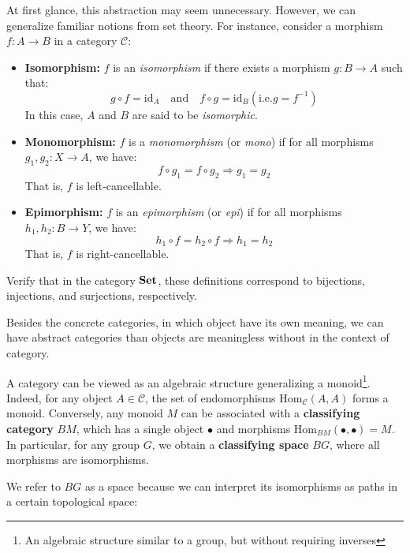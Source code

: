 At first glance, this abstraction may seem unnecessary. However, we can generalize familiar notions from set theory. For instance, consider a morphism $f: A \to B$ in a category $\mathcal{C}$:

\begin{itemize}
    \item \textbf{Isomorphism:} $f$ is an \emph{isomorphism} if there exists a morphism $g: B \to A$ such that:
    \[
      g \circ f = \mathrm{id}_A \quad \text{and} \quad f \circ g = \mathrm{id}_B (\text{i.e.} g=f^{-1})
    \]
    In this case, $A$ and $B$ are said to be \emph{isomorphic}.

    \item \textbf{Monomorphism:} $f$ is a \emph{monomorphism} (or \emph{mono}) if for all morphisms $g_1, g_2: X \to A$, we have:
    \[
    f \circ g_1 = f \circ g_2 \Rightarrow g_1 = g_2
    \]
    That is, $f$ is left-cancellable.

    \item \textbf{Epimorphism:} $f$ is an \emph{epimorphism} (or \emph{epi}) if for all morphisms $h_1, h_2: B \to Y$, we have:
    \[
    h_1 \circ f = h_2 \circ f \Rightarrow h_1 = h_2
    \]
    That is, $f$ is right-cancellable.

\end{itemize}
\begin{exercise}
Verify that in the category $\mathbf{Set}$, these definitions correspond to bijections, injections, and surjections, respectively.
\end{exercise}

Besides the concrete categories, in which object have its own meaning, we can have abstract categories than objects are meaningless without in the context of category.
\begin{example}
  A category can be viewed as an algebraic structure generalizing a monoid\footnote{An algebraic structure similar to a group, but without requiring inverses}. Indeed, for any object $A \in \mathcal{C}$, the set of endomorphisms $\mathrm{Hom}_{\mathcal{C}}(A, A)$ forms a monoid. Conversely, any monoid $M$ can be associated with a \textbf{classifying category} $BM$, which has a single object $\bullet$ and morphisms $\mathrm{Hom}_{BM}(\bullet, \bullet) = M$. In particular, for any group $G$, we obtain a \textbf{classifying space} $BG$, where all morphisms are isomorphisms.
\end{example}

We refer to $BG$ as a space because we can interpret its isomorphisms as paths in a certain topological space:

